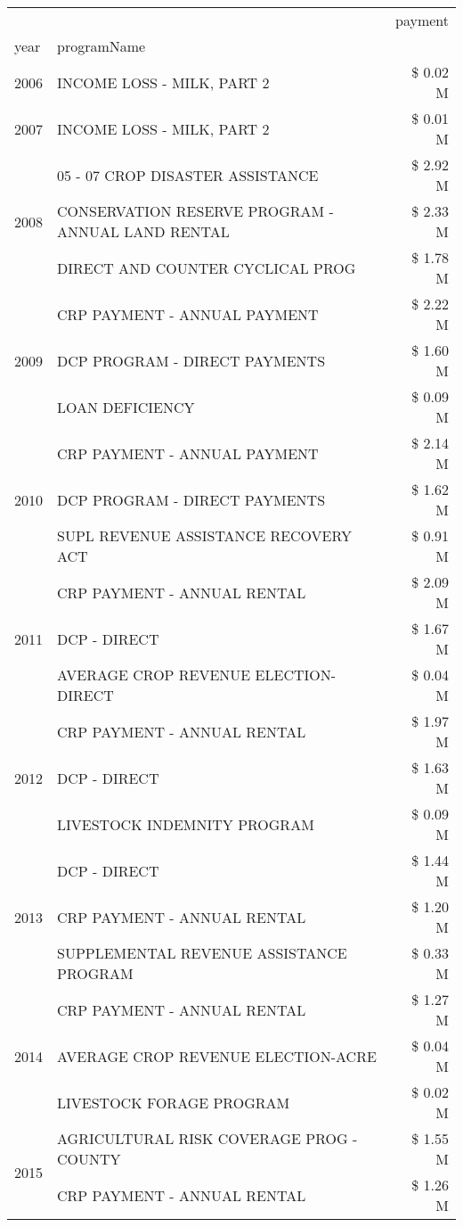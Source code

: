 \begin{tabular}{llr}
\toprule
 &  & payment \\
year & programName &  \\
\midrule
2006 & INCOME LOSS - MILK, PART 2 & \$ 0.02 M \\
\cline{1-3}
2007 & INCOME LOSS - MILK, PART 2 & \$ 0.01 M \\
\cline{1-3}
\multirow[t]{3}{*}{2008} & 05 - 07 CROP DISASTER ASSISTANCE & \$ 2.92 M \\
 & CONSERVATION RESERVE PROGRAM - ANNUAL LAND RENTAL & \$ 2.33 M \\
 & DIRECT AND COUNTER CYCLICAL PROG & \$ 1.78 M \\
\cline{1-3}
\multirow[t]{3}{*}{2009} & CRP PAYMENT - ANNUAL PAYMENT & \$ 2.22 M \\
 & DCP PROGRAM - DIRECT PAYMENTS & \$ 1.60 M \\
 & LOAN DEFICIENCY & \$ 0.09 M \\
\cline{1-3}
\multirow[t]{3}{*}{2010} & CRP PAYMENT - ANNUAL PAYMENT & \$ 2.14 M \\
 & DCP PROGRAM - DIRECT PAYMENTS & \$ 1.62 M \\
 & SUPL REVENUE ASSISTANCE RECOVERY ACT & \$ 0.91 M \\
\cline{1-3}
\multirow[t]{3}{*}{2011} & CRP PAYMENT - ANNUAL RENTAL & \$ 2.09 M \\
 & DCP - DIRECT & \$ 1.67 M \\
 & AVERAGE CROP REVENUE ELECTION-DIRECT & \$ 0.04 M \\
\cline{1-3}
\multirow[t]{3}{*}{2012} & CRP PAYMENT - ANNUAL RENTAL & \$ 1.97 M \\
 & DCP - DIRECT & \$ 1.63 M \\
 & LIVESTOCK INDEMNITY PROGRAM & \$ 0.09 M \\
\cline{1-3}
\multirow[t]{3}{*}{2013} & DCP - DIRECT & \$ 1.44 M \\
 & CRP PAYMENT - ANNUAL RENTAL & \$ 1.20 M \\
 & SUPPLEMENTAL REVENUE ASSISTANCE PROGRAM & \$ 0.33 M \\
\cline{1-3}
\multirow[t]{3}{*}{2014} & CRP PAYMENT - ANNUAL RENTAL & \$ 1.27 M \\
 & AVERAGE CROP REVENUE ELECTION-ACRE & \$ 0.04 M \\
 & LIVESTOCK FORAGE PROGRAM & \$ 0.02 M \\
\cline{1-3}
\multirow[t]{3}{*}{2015} & AGRICULTURAL RISK COVERAGE PROG - COUNTY & \$ 1.55 M \\
 & CRP PAYMENT - ANNUAL RENTAL & \$ 1.26 M \\

\end{tabular}

